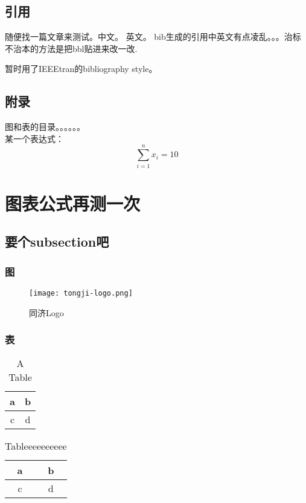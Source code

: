 	
\subsection{引用}
	随便找一篇文章来测试。中文\cite{余胜泉2000}。 英文\cite{liu2010system}。
	bib生成的引用中英文有点凌乱。。。治标不治本的方法是把bbl贴进来改一改.
	
	暂时用了IEEEtran的bibliography style。


\subsection{附录}

	图和表的目录。。。。。。\\
	某一个表达式：
	\begin{equation}
	 \sum_{i=1}^{n}x_i = 10
	\end{equation}
	




\section{图表公式再测一次}

\subsection{要个subsection吧}

\subsubsection{图}
	\begin{figure}[h!]
		\centering
		\texttt{[image: tongji-logo.png]}
		\caption{同济Logo}
		\label{fig:tongji2}
	\end{figure}

\subsubsection{表}
		\begin{table}[h!]
		\centering
			\caption{A Table}
			\begin{tabular}{c|c}
			a & b \\ \hline
			c & d \\ \hline
			\end{tabular}
		\end{table}
		
		\begin{table}[h!]
			\centering
				\caption{Tableeeeeeeeee}
				\label{tb:test_tb2}
				\begin{tabular}{c|c}
				a & b \\ \hline
				c & d \\ \hline
				\end{tabular}
			\end{table}
			
